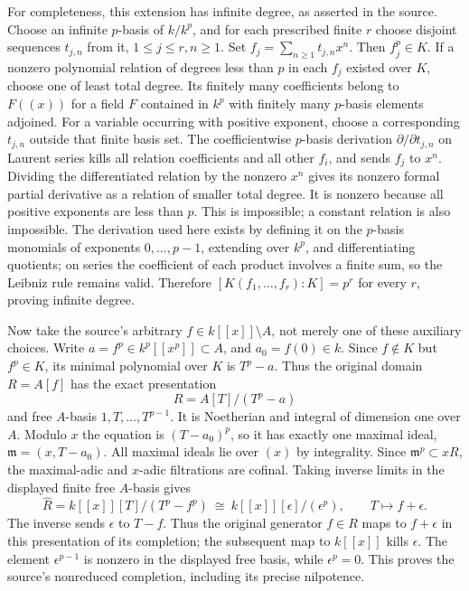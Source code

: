 For completeness, this extension has infinite degree, as asserted in the source. Choose an infinite \(p\)-basis of \(k/k^p\), and for each prescribed finite \(r\) choose disjoint sequences \(t_{j,n}\) from it, \(1\le j\le r,n\ge1\). Set \(f_j=\sum_{n\ge1}t_{j,n}x^n\). Then \(f_j^p\in K\). If a nonzero polynomial relation of degrees less than \(p\) in each \(f_j\) existed over \(K\), choose one of least total degree. Its finitely many coefficients belong to \(F((x))\) for a field \(F\) contained in \(k^p\) with finitely many \(p\)-basis elements adjoined. For a variable occurring with positive exponent, choose a corresponding \(t_{j,n}\) outside that finite basis set. The coefficientwise \(p\)-basis derivation \(\partial/\partial t_{j,n}\) on Laurent series kills all relation coefficients and all other \(f_i\), and sends \(f_j\) to \(x^n\). Dividing the differentiated relation by the nonzero \(x^n\) gives its nonzero formal partial derivative as a relation of smaller total degree. It is nonzero because all positive exponents are less than \(p\). This is impossible; a constant relation is also impossible. The derivation used here exists by defining it on the \(p\)-basis monomials of exponents \(0,\ldots,p-1\), extending over \(k^p\), and differentiating quotients; on series the coefficient of each product involves a finite sum, so the Leibniz rule remains valid. Therefore \([K(f_1,\ldots,f_r):K]=p^r\) for every \(r\), proving infinite degree.

Now take the source's arbitrary \(f\in k[[x]]\setminus A\), not merely one of these auxiliary choices. Write \(a=f^p\in k^p[[x^p]]\subset A\), and \(a_0=f(0)\in k\). Since \(f\notin K\) but \(f^p\in K\), its minimal polynomial over \(K\) is \(T^p-a\). Thus the original domain \(R=A[f]\) has the exact presentation \[
 R=A[T]/(T^p-a)
\] and free \(A\)-basis \(1,T,\ldots,T^{p-1}\). It is Noetherian and integral of dimension one over \(A\). Modulo \(x\) the equation is \((T-a_0)^p\), so it has exactly one maximal ideal, \(\mathfrak m=(x,T-a_0)\). All maximal ideals lie over \((x)\) by integrality. Since \(\mathfrak m^p\subset xR\), the maximal-adic and \(x\)-adic filtrations are cofinal. Taking inverse limits in the displayed finite free \(A\)-basis gives \[
 \widehat R=k[[x]][T]/(T^p-f^p)
       \ \cong\ k[[x]][\epsilon]/(\epsilon^p),\qquad T\longmapsto f+\epsilon.
\] The inverse sends \(\epsilon\) to \(T-f\). Thus the original generator \(f\in R\) maps to \(f+\epsilon\) in this presentation of its completion; the subsequent map to \(k[[x]]\) kills \(\epsilon\). The element \(\epsilon^{p-1}\) is nonzero in the displayed free basis, while \(\epsilon^p=0\). This proves the source's nonreduced completion, including its precise nilpotence.

